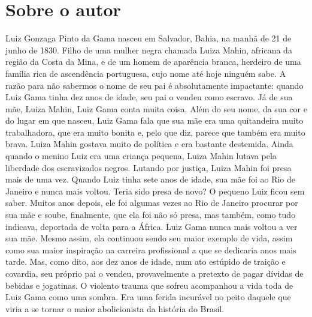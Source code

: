 
\section{Sobre o autor}

Luiz Gonzaga Pinto da Gama nasceu em Salvador, Bahia, na manhã
de 21 de junho de 1830. Filho de uma mulher negra chamada Luiza Mahin,
africana da região da Costa da Mina, e de um homem de aparência branca,
herdeiro de uma família rica de ascendência portuguesa, cujo nome até
hoje ninguém sabe. A razão para não sabermos o nome de seu pai é
absolutamente impactante: quando Luiz Gama tinha dez anos de idade, seu
pai o vendeu como escravo. Já de sua mãe, Luiza Mahin, Luiz Gama conta
muita coisa. Além do seu nome, da sua cor e do lugar em que nasceu, Luiz
Gama fala que sua mãe era uma quitandeira muito trabalhadora, que era
muito bonita e, pelo que diz, parece que também era muito brava. Luiza
Mahin gostava muito de política e era bastante destemida. Ainda quando o
menino Luiz era uma criança pequena, Luiza Mahin lutava pela liberdade
dos escravizados negros. Lutando por justiça, Luiza Mahin foi presa mais
de uma vez. Quando Luiz tinha sete anos de idade, sua mãe foi ao Rio de
Janeiro e nunca mais voltou. Teria sido presa de novo? O pequeno Luiz
ficou sem saber. Muitos anos depois, ele foi algumas vezes ao Rio de
Janeiro procurar por sua mãe e soube, finalmente, que ela foi não só
presa, mas também, como tudo indicava, deportada de volta para a África.
Luiz Gama nunca mais voltou a ver sua mãe. Mesmo assim, ela continuou
sendo seu maior exemplo de vida, assim como sua maior inspiração na
carreira profissional a que se dedicaria anos mais tarde. Mas, como
dito, aos dez anos de idade, num ato estúpido de traição e covardia, seu
próprio pai o vendeu, provavelmente a pretexto de pagar dívidas de
bebidas e jogatinas. O violento trauma que sofreu acompanhou a vida toda
de Luiz Gama como uma sombra. Era uma ferida incurável no peito daquele
que viria a se tornar o maior abolicionista da história do Brasil.

